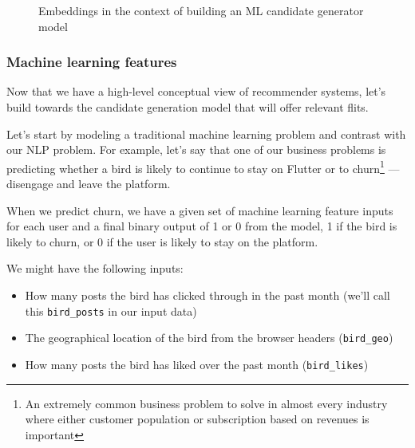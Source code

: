 \documentclass[11pt, table]{diazessay} %
\begin{document}
\begin{sloppypar}
\begin{figure}[H]
\caption{Embeddings in the context of building an ML candidate generator model}
\end{figure}


\subsubsection{Machine learning features}

Now that we have a high-level conceptual view of recommender systems, let's build towards the candidate generation model that will offer relevant flits. 

Let's start by modeling a traditional machine learning problem and contrast with our NLP problem. For example, let's say that one of our business problems is predicting whether a bird is likely to continue to stay on Flutter or to churn\footnote{An extremely common business problem to solve in almost every industry where either customer population or subscription based on revenues is important} --- disengage and leave the platform.

When we predict churn, we have a given set of machine learning feature inputs for each user and a final binary output of 1 or 0 from the model, 1 if the bird is likely to churn, or 0 if the user is likely to stay on the platform. 

We might have the following inputs: 

\begin{itemize}
  \item How many posts the bird has clicked through in the past month (we'll call this \texttt{bird_posts} in our input data)
  \item The geographical location of the bird from the browser headers (\texttt{bird_geo})
  \item How many posts the bird has liked over the past month (\texttt{bird_likes})
\end{itemize}




\end{sloppypar}
\end{document}
